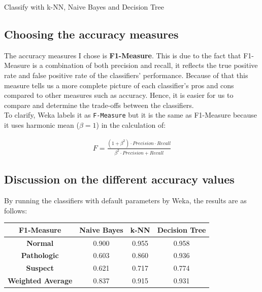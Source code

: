 \documentclass[12pt]{article}
\begin{document}
\begin{section}{Classify with k-NN, Naive Bayes and Decision Tree}
 \subsection{Choosing the accuracy measures}
 The accuracy measures I chose is \textbf{F1-Measure}. This is due to the fact
 that F1-Measure is a combination of both precision and recall, it reflects
 the true positive rate and false positive rate of the classifiers' performance.
 Because of that this measure tells us a more complete picture of each classifier's
 pros and cons compared to other measures such as accuracy. Hence, it is easier for
 us to compare and determine the trade-offs between the classifiers. \\

 To clarify, Weka labels it as \texttt{F-Measure} but it is the same as F1-Measure
 because it uses harmonic mean ($\beta = 1$) in the calculation of:

 \begin{align*}
     F = \frac{(1 + \beta^2) \cdot Precision \cdot Recall}{\beta^2 \cdot Precision + Recall}
 \end{align*}

 \subsection{Discussion on the different accuracy values}
 By running the classifiers with default parameters by Weka, the results are as follows:

 \begin{center}
     \begin{tabular}{| c | c | c | c |}
         \hline
         \textbf{F1-Measure}       & \textbf{Naive Bayes} & \textbf{k-NN} & \textbf{Decision Tree} \\ [0.5ex]
         \hline
         \textbf{Normal}           & 0.900                & 0.955         & 0.958                  \\
         \hline
         \textbf{Pathologic}       & 0.603                & 0.860         & 0.936                  \\
         \hline
         \textbf{Suspect}          & 0.621                & 0.717         & 0.774                  \\
         \hline
         \hline
         \textbf{Weighted Average} & 0.837                & 0.915         & 0.931                  \\
         \hline
     \end{tabular}
 \end{center}


\end{section}
\end{document}
